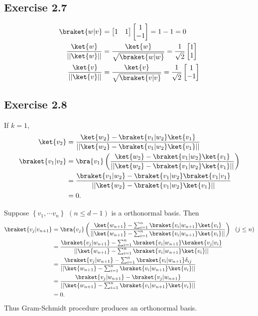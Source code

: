 \documentclass[a4paper,12pt]{article}
\begin{document}
\subsection*{Exercise 2.7}
\begin{align*}
	\braket{w | v} &= \begin{bmatrix}
		1 & 1
	\end{bmatrix}
	\begin{bmatrix}
	1 \\
	-1
	\end{bmatrix}
	= 1 - 1 = 0\\
%
	\frac{\ket{w}}{||{\ket{w}}||} &=
	\frac{\ket{w}}{\sqrt{\braket{w|w}}} = \frac{1}{\sqrt{2}} \begin{bmatrix}
	1 \\
	1
	\end{bmatrix}\\
%
	\frac{\ket{v}}{||\ket{v}||} &=
	\frac{\ket{v}}{\sqrt{\braket{v|v}}} = \frac{1}{\sqrt{2}} \begin{bmatrix}
	1 \\
	-1
	\end{bmatrix}
\end{align*}



\subsection*{Exercise 2.8}
If $k = 1$,
\begin{align*}
	\ket{v_2} &= \frac{\ket{w_2} - \braket{v_1 | w_2}\ket{v_1}}{||\ket{w_2} - \braket{v_1 | w_2}\ket{v_1}||}\\
	\braket{v_1 | v_2} &= \bra{v_1} \left(\frac{\ket{w_2} - \braket{v_1 | w_2}\ket{v_1}}{||\ket{w_2} - \braket{v_1 | w_2}\ket{v_1}||}\right)\\
		&= \frac{\braket{v_1 | w_2} - \braket{v_1 | w_2}\braket{v_1 | v_1}}{||\ket{w_2} - \braket{v_1 | w_2}\ket{v_1}||}\\
		&= 0.
\end{align*}

Suppose $\left\{v_1, \cdots v_n \right\}$ $(n \leq d-1)$ is a orthonormal basis. Then
\begin{align*}
	\braket{v_j | v_{n+1}} &= \bra{v_j} \left(\frac{\ket{w_{n+1}} - \sum_{i=1}^{n}\braket{v_i | w_{n+1}}\ket{v_i}}{||\ket{w_{n+1}} - \sum_{i=1}^{n}\braket{v_i | w_{n+1}}\ket{v_i}||}\right)~~(j \leq n)\\
	&= \frac{\braket{v_j | w_{n+1}} - \sum_{i=1}^{n}\braket{v_i | w_{n+1}}\braket{v_j | v_i}}{||\ket{w_{n+1}} - \sum_{i=1}^{n}\braket{v_i | w_{n+1}}\ket{v_i}||}\\
	&= \frac{\braket{v_j | w_{n+1}} - \sum_{i=1}^{n}\braket{v_i | w_{n+1}}\delta_{ij}}{||\ket{w_{n+1}} - \sum_{i=1}^{n}\braket{v_i | w_{n+1}}\ket{v_i}||}\\
	&= \frac{\braket{v_j | w_{n+1}} - \braket{v_j | w_{n+1}}}{||\ket{w_{n+1}} - \sum_{i=1}^{n}\braket{v_i | w_{n+1}}\ket{v_i}||}\\
	&= 0.
\end{align*}
Thus Gram-Schmidt procedure produces an orthonormal basis.
\end{document}
